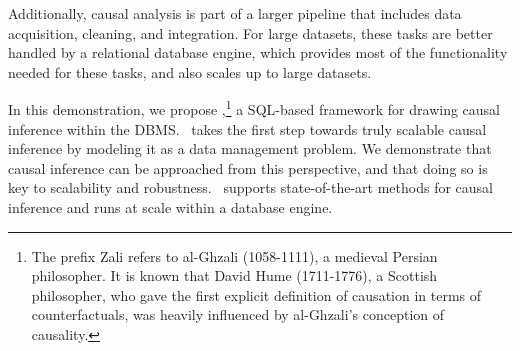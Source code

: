  Additionally, causal analysis is part of a larger pipeline that includes data acquisition,  cleaning, and integration. For large datasets, these tasks are better handled by a relational database engine, which provides most of the functionality needed for these tasks, and also scales up to large datasets. %


In this demonstration, we propose \GSQL,\footnote{ The prefix Zali refers to
  al-Ghzali (1058-1111), a medieval Persian philosopher. It is known
  that David Hume (1711-1776), a Scottish philosopher, who gave the
  first explicit definition of causation in terms of counterfactuals,
  was heavily influenced by al-Ghzali's conception of causality.}
  a SQL-based framework for drawing causal inference within the DBMS. \GSQL\ takes the first step towards truly scalable causal inference by modeling it as a data management problem. We demonstrate that
  causal inference can be approached from this perspective, and that doing so is key to scalability and robustness.  \GSQL\ supports state-of-the-art methods for causal inference and runs at scale within a database engine.  




